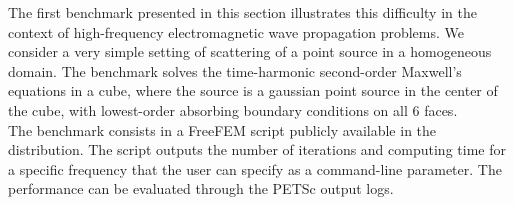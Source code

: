 The first benchmark presented in this section illustrates this difficulty in the context of high-frequency electromagnetic wave propagation problems. We consider a very simple setting of scattering of a point source in a homogeneous domain. The benchmark solves the time-harmonic second-order Maxwell's equations in a cube, where the source is a gaussian point source in the center of the cube, with lowest-order absorbing boundary conditions on all 6 faces.\\
The benchmark consists in a FreeFEM script publicly available in the distribution. The script outputs the number of iterations and computing time for a specific frequency that the user can specify as a command-line parameter. The performance can be evaluated through the PETSc output logs.\\

